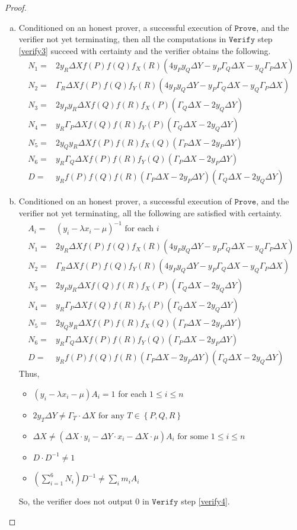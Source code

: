 \documentclass[11pt,letterpaper]{article}
\theoremstyle{definition}
\newcommand{\6}{\mathbf}
\newcommand{\7}{\mathcal}
\newcommand{\non}{2 y_R \Delta X f(P)f(Q)f_X(R)(4 y_P y_Q  \Delta Y - y_P  \Gamma_Q \Delta X  - y_Q  \Gamma_P \Delta X )}
\newcommand{\ntw}{\Gamma_R \Delta X f(P)f(Q)f_Y(R)(4 y_P y_Q \Delta Y - y_P \Gamma_Q \Delta X  - y_Q \Gamma_P \Delta X )}
\newcommand{\nth}{2 y_P y_R \Delta X f(Q)f(R)f_X(P)(\Gamma_Q \Delta X - 2 y_Q \Delta Y)}
\newcommand{\nfo}{y_R \Gamma_P \Delta X f(Q)f(R)f_Y(P)(\Gamma_Q \Delta X  - 2  y_Q \Delta Y)}
\newcommand{\nfi}{2 y_Q y_R \Delta X  f(P)f(R)f_X(Q)(\Gamma_P \Delta X - 2 y_P \Delta Y) }
\newcommand{\nsi}{y_R \Gamma_Q \Delta X f(P)f(R)f_Y(Q)(\Gamma_P  \Delta X - 2  y_P \Delta Y) }
\newcommand{\den}{y_R f(P)f(Q)f(R)(\Gamma_P\Delta X - 2 y_P \Delta Y)(\Gamma_Q\Delta X - 2 y_Q \Delta Y)}
\newcommand{\VerEquA}{2 y_T \Delta Y  \neq \Gamma_T \cdot \Delta X \text{ for any } T \in \left\{P,Q,R\right\}}
\newcommand{\VerEquB}{\Delta X \neq  (\Delta X \cdot y_i - \Delta Y \cdot x_i - \Delta X \cdot \mu) A_i \text{ for some }1 \leq i \leq n}
\newcommand{\VerEquC}{D \cdot D^{-1} \neq 1}
\newcommand{\VerEquD}{\left(\sum_{i=1}^{6} N_i\right) D^{-1} \neq \sum_i m_i A_i}
\begin{document}
\begin{proof}
\begin{enumerate}[(a)]
\item Conditioned on an honest prover, a successful execution of $\texttt{Prove}$, and the verifier not yet terminating, then all the computations in $\texttt{Verify}$ step \ref{verify3} succeed with certainty and the verifier obtains the following.
\begin{align*}
N_1 =& \non \\
N_2 =& \ntw \\
N_3 =& \nth \\
N_4 =& \nfo \\
N_5 =& \nfi \\
N_6 =& \nsi \\
D =& \den 
\end{align*} 

\item Conditioned on an honest prover, a successful execution of $\texttt{Prove}$, and the verifier not yet terminating, all the following are satisfied with certainty.
\begin{align*}
A_i =& (y_i - \lambda x_i - \mu)^{-1}\text{ for each }i \\
N_1 =& \non \\
N_2 =& \ntw \\
N_3 =& \nth \\
N_4 =& \nfo \\
N_5 =& \nfi \\
N_6 =& \nsi \\
D =& \den 
\end{align*}
Thus,

\renewcommand\labelitemi{--}
\begin{itemize}
\item $(y_i - \lambda x_i - \mu)A_i = 1$ for each $1 \leq i \leq n$
\item $\VerEquA$
\item $\VerEquB$
\item $\VerEquC$
\item $\VerEquD$
\end{itemize}
So, the verifier does not output $0$ in $\texttt{Verify}$ step \ref{verify4}.


\end{enumerate}
\end{proof}
\end{document}
